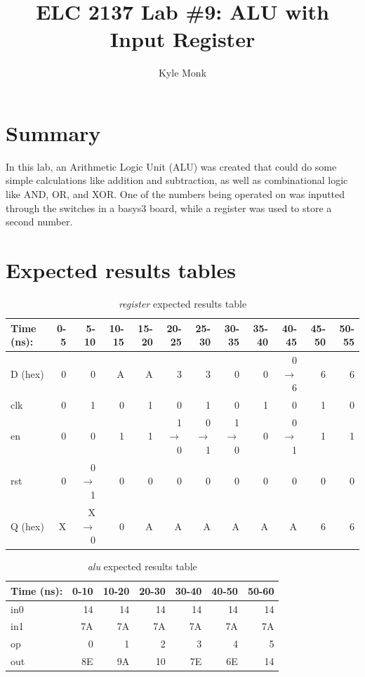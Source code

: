 \documentclass[11pt]{article}
\begin{document}
\title{ELC 2137 Lab \#9: ALU with Input Register}
\author{Kyle Monk}
\maketitle

\section*{Summary}
In this lab, an Arithmetic Logic Unit (ALU) was created that could do some simple calculations like addition and subtraction, as well as combinational logic like AND, OR, and XOR. One of the numbers being operated on was inputted through the switches in a basys3 board, while a register was used to store a second number. 

\section*{Expected results tables}

\begin{table}[ht]\centering
	\caption{\textit{register} expected results table}
	\label{ALU:tbl:register_ERT}\medskip
	\begin{tabular}{l|rrrrrrrrrrr}
		Time (ns): & 0-5 & 5-10 & 10-15 & 15-20 & 20-25 & 25-30 & 30-35 & 35-40 & 40-45 & 45-50 & 50-55 \\
		\midrule
		D (hex) & 0 & 0 	  & A & A & 3 	    & 3 	  & 0 	    & 0 & 0$\to$6 & 6 & 6 \\
		clk     & 0 & 1 	  & 0 & 1 & 0 	    & 1 	  & 0 	    & 1 & 0 	  & 1 & 0 \\
		en  	& 0 & 0 	  & 1 & 1 & 1$\to$0 & 0$\to$1 & 1$\to$0 & 0 & 0$\to$1 & 1 & 1 \\
		rst 	& 0 & 0$\to$1 & 0 & 0 & 0 		& 0 	  & 0		& 0 & 0		  & 0 & 0 \\
		\midrule
		Q (hex) & X & X$\to$0 & 0 & A & A & A & A & A & A & 6 & 6 \\
		\bottomrule
	\end{tabular}
\end{table}

\begin{table}[ht]\centering
	\caption{\textit{alu} expected results table}
	\label{ALU:tbl:alu_ERT}\medskip
	\begin{tabular}{l|rrrrrr}
		Time (ns): & 0-10 & 10-20 & 20-30 & 30-40 & 40-50 & 50-60 \\
		\midrule
		in0 & 14 & 14 & 14 & 14 & 14 & 14 \\
		in1 & 7A & 7A & 7A & 7A & 7A & 7A \\
		op	& 0 & 1 & 2 & 3 & 4 & 5 \\
		\midrule
		out & 8E & 9A & 10 & 7E & 6E & 14 \\
		\bottomrule
	\end{tabular}
\end{table}
\end{document}
